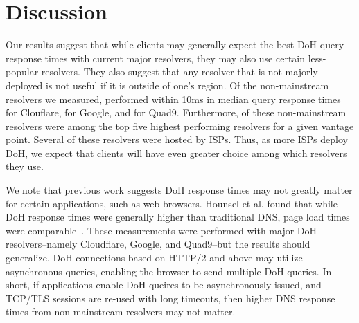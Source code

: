 \section{Discussion}\label{sec:discussion}
Our results suggest that while clients may generally expect the best DoH query response times with current major resolvers, they may also use certain less-popular resolvers.
They also suggest that any resolver that is not majorly deployed is not useful if it is outside of one's region.
Of the  non-mainstream resolvers we measured,  performed within 10ms in median query response times for Clouflare,  for Google, and  for Quad9.
Furthermore,  of these non-mainstream resolvers were among the top five highest performing resolvers for a given vantage point.
Several of these resolvers were hosted by ISPs.
Thus, as more ISPs deploy DoH, we expect that clients will have even greater choice among which resolvers they use.

We note that previous work suggests DoH response times may not greatly matter for certain applications, such as web browsers.
Hounsel et al. found that while DoH response times were generally higher than traditional DNS, page load times were comparable~\cite{hounsel2020comparing}.
These measurements were performed with major DoH resolvers--namely Cloudflare, Google, and Quad9--but the results should generalize.
DoH connections based on HTTP/2 and above may utilize asynchronous queries, enabling the browser to send multiple DoH queries.
In short, if applications enable DoH queires to be asynchronously issued, and TCP/TLS sessions are re-used with long timeouts, then higher DNS response times from non-mainstream resolvers may not matter.
